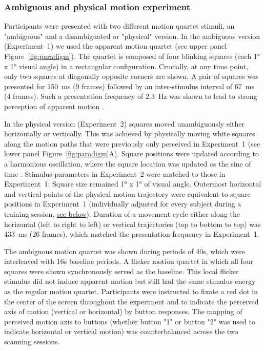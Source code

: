 \subsubsection{Ambiguous and physical motion experiment}
Participants were presented with two different motion quartet stimuli, an "ambiguous" and a disambiguated or "physical" version. In the ambiguous version (Experiment~1) we used the apparent motion quartet \parencite{Ramachandran1985} (see upper panel Figure~\ref{fig:paradigm}). The quartet is composed of four blinking squares (each 1° x 1° visual angle) in a rectangular configuration. Crucially, at any time point, only two squares at diagonally opposite corners are shown. A pair of squares was presented for 150~ms (9 frames) followed by an inter-stimulus interval of 67~ms (4 frames). Such a presentation frequency of 2.3~Hz was shown to lead to strong perception of apparent motion \parencite{Finlay1987}.

In the physical version (Experiment~2) squares moved unambiguously either horizontally or vertically. This was achieved by physically moving white squares along the motion paths that were previously only perceived in Experiment~1 (see lower panel Figure~\ref{fig:paradigm}A). Square positions were updated according to a harmonious oscillation, where the square location was updated as the sine of time \parencite{Muckli2005}. Stimulus parameters in Experiment~2 were matched to those in Experiment~1: Square size remained 1° x 1° of visual angle. Outermost horizontal and vertical points of the physical motion trajectory were equivalent to square positions in Experiment~1 (individually adjusted for every subject during a training session, \hyperref[sec:trainses]{see below}). Duration of a movement cycle either along the horizontal (left to right to left) or vertical trajectories (top to bottom to top) was 433~ms (26 frames), which matched the presentation frequency in Experiment~1.

The ambiguous motion quartet was shown during periods of 40s, which were interleaved with 16s baseline periods. A flicker motion quartet in which all four squares were shown synchronously served as the baseline. This local flicker stimulus did not induce apparent motion but still had the same stimulus energy as the regular motion quartet. Participants were instructed to fixate a red dot in the center of the screen throughout the experiment and to indicate the perceived axis of motion (vertical or horizontal) by button responses. The mapping of perceived motion axis to buttons (whether button "1" or button "2" was used to indicate horizontal or vertical motion) was counterbalanced across the two scanning sessions.

